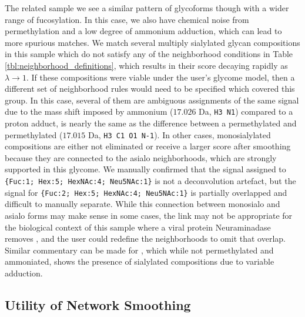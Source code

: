         The related \dpphil sample we see a similar pattern of glycoforms though with a wider range of
    fucosylation. In this case, we also have chemical noise from permethylation and a low degree of
    ammonium adduction, which can lead to more spurious matches. We match several multiply
    sialylated glycan compositions in this sample which do not satisfy any of the neighborhood conditions
    in Table \ref{tbl:neighborhood_definitions}, which results in their score decaying rapidly as $\lambda\rightarrow1$.
    If these compositions were viable under the user's glycome model, then a different set of neighborhood
    rules would need to be specified which covered this group. In this case, several of them are ambiguous
    assignments of the same signal due to the mass shift imposed by ammonium ($17.026$ Da, \texttt{H3 N1}) compared to a proton
    adduct, is nearly the same as the difference between a permethylated  and permethylated
     ($17.015$ Da, \texttt{H3 C1 O1 N-1}). In other cases, monosialylated compositions
    are either not eliminated or receive a larger score after smoothing because they are connected to the
    asialo neighborhoods, which are strongly supported in this glycome. We manually confirmed that the
    signal assigned to \texttt{\{{Fuc:1; Hex:5; HexNAc:4; Neu5NAc:1}\}} is not a deconvolution artefact,
    but the signal for \texttt{\{{Fuc:2; Hex:5; HexNAc:4; Neu5NAc:1}\}} is partially overlapped and 
    difficult to manually separate. While this connection between monosialo and asialo forms may make sense
    in some cases, the link may not be appropriate for the biological context of this sample where
    a viral protein Neuraminadase removes , and the user could redefine the
    neighborhoods to omit that overlap. Similar commentary can be made for \philbs, which while not
    permethylated and ammoniated, shows the presence of sialylated compositions due to variable adduction.

    \subsection{Utility of Network Smoothing}
